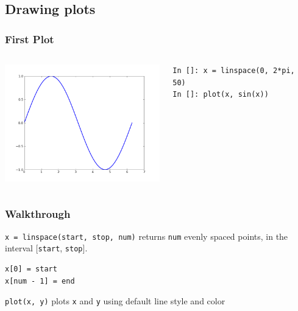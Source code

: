 \documentclass[14pt,compress]{beamer}
\newcounter{time}
\newcommand{\inctime}[1]{\addtocounter{time}{#1}{\tiny \thetime\ m}}
\newcommand{\typ}[1]{\lstinline{#1}}
\begin{document}
\subsection{Drawing plots}
\begin{frame}[fragile]
\frametitle{First Plot}
\begin{columns}
    \hspace*{-0.5in}
  \includegraphics[height=2in, interpolate=true]{data/firstplot}
    \begin{block}{}
    \begin{small}
\begin{lstlisting}
In []: x = linspace(0, 2*pi, 50)
In []: plot(x, sin(x))
\end{lstlisting}
    \end{small}
    \end{block}
\end{columns}
\end{frame}

\begin{frame}[fragile]
\frametitle{Walkthrough}
\begin{block}{\typ{x = linspace(start, stop, num)} }
returns \typ{num} evenly spaced points, in the interval [\typ{start}, \typ{stop}].
\end{block}
\begin{lstlisting}
x[0] = start
x[num - 1] = end
\end{lstlisting}
\vspace*{.35in}
\begin{block}{\typ{plot(x, y)}}
plots \typ{x} and \typ{y} using default line style and color
\end{block}
\end{frame}
\end{document}
